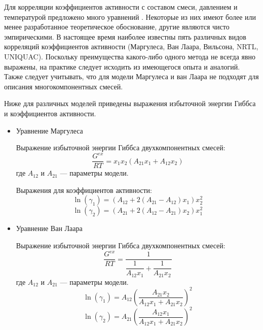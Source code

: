 Для корреляции коэффициентов активности с составом смеси, давлением и температурой предложено много уравнений \cite{rid1982,yelles1989}. Некоторые из них имеют более или менее разработанное теоретическое обоснование, другие являются чисто эмпирическими. В настоящее время наиболее известны пять различных видов корреляций коэффициентов активности (Маргулеса, Ван Лаара, Вильсона, NRTL, UNIQUAC). Поскольку преимущества какого-либо одного метода не всегда явно выражены, на практике следует исходить из имеющегося опыта и аналогий. Также следует учитывать, что для модели Маргулеса и ван Лаара не подходят для описания многокомпонентных смесей.

Ниже для различных моделей приведены выражения избыточной энергии Гиббса и коэффициентов активности.
\begin{itemize}
	\item Уравнение Маргулеса
	
	Выражение избыточной энергии Гиббса двухкомпонентных смесей:
	\begin{equation}\label{eq.phase.gemarg}
	\frac{G^{ex}}{RT}=x_1 x_2 (A_{21} x_1+ A_{12} x_2)
	\end{equation}
	где $A_{12}$ и $A_{21}$ --- параметры модели.
	
	Выражения для коэффициентов активности:
	\begin{equation} \label{eq.phase.ga1marg}
	\ln(\gamma_1)=(A_{12}+2(A_{21}-A_{12})x_1)x_2^2
	\end{equation}
	\begin{equation} \label{eq.phase.ga2marg}
	\ln(\gamma_2)=(A_{21}+2(A_{12}-A_{21})x_2)x_1^2
	\end{equation}
	
	\item Уравнение Ван Лаара
	
	Выражение избыточной энергии Гиббса двухкомпонентных смесей:
	\begin{equation}\label{eq.phase.gewlar}
	\frac{G^{ex}}{RT}=\dfrac{1}{\dfrac{1}{A_{12} x_1}+ \dfrac{1}{A_{21}x_2}}
	\end{equation}
	где $A_{12}$ и $A_{21}$ --- параметры модели.
	\begin{equation}
	\ln(\gamma_1)=A_{12}\left( \dfrac{A_{21}x_2}{A_{12}x_1 + A_{21} x_2}\right)^2
	\end{equation}
	\begin{equation}
	\ln(\gamma_2)=A_{21}\left( \dfrac{A_{12}x_1}{A_{12}x_1 + A_{21} x_2}\right)^2
	\end{equation}
	

\end{itemize}
